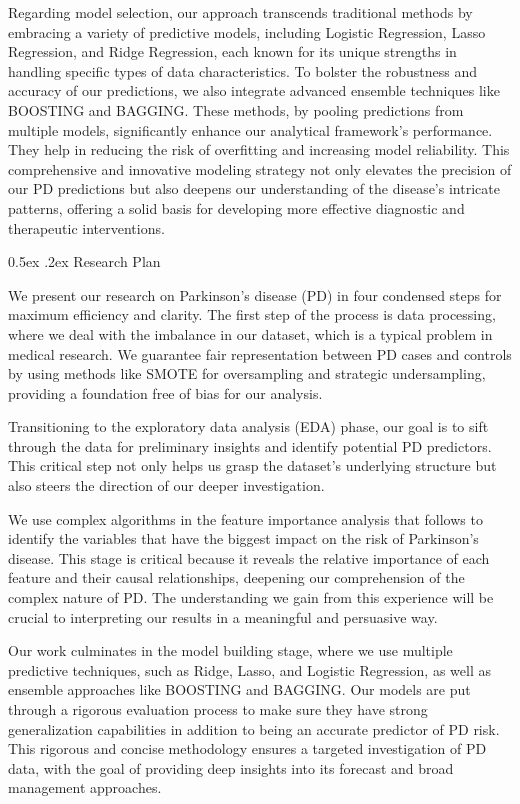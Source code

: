 \documentclass[12pt,]{article}
\makeatletter
\renewcommand\subsection{
  \@startsection{subsection}{2}{\z@}
    {-1.5ex\@plus -1ex \@minus -.2ex}%
    {0.5ex \@plus .2ex}%
    {\normalfont\normalsize\bf}} %
\makeatother
\begin{document}
Regarding model selection, our approach transcends traditional methods
by embracing a variety of predictive models, including Logistic
Regression, Lasso Regression, and Ridge Regression, each known for its
unique strengths in handling specific types of data characteristics. To
bolster the robustness and accuracy of our predictions, we also
integrate advanced ensemble techniques like BOOSTING and BAGGING. These
methods, by pooling predictions from multiple models, significantly
enhance our analytical framework's performance. They help in reducing
the risk of overfitting and increasing model reliability. This
comprehensive and innovative modeling strategy not only elevates the
precision of our PD predictions but also deepens our understanding of
the disease's intricate patterns, offering a solid basis for developing
more effective diagnostic and therapeutic interventions.

\hypertarget{research-plan}{%
\subsection{Research Plan}\label{research-plan}}

We present our research on Parkinson's disease (PD) in four condensed
steps for maximum efficiency and clarity. The first step of the process
is data processing, where we deal with the imbalance in our dataset,
which is a typical problem in medical research. We guarantee fair
representation between PD cases and controls by using methods like SMOTE
for oversampling and strategic undersampling, providing a foundation
free of bias for our analysis.

Transitioning to the exploratory data analysis (EDA) phase, our goal is
to sift through the data for preliminary insights and identify potential
PD predictors. This critical step not only helps us grasp the dataset's
underlying structure but also steers the direction of our deeper
investigation.

We use complex algorithms in the feature importance analysis that
follows to identify the variables that have the biggest impact on the
risk of Parkinson's disease. This stage is critical because it reveals
the relative importance of each feature and their causal relationships,
deepening our comprehension of the complex nature of PD. The
understanding we gain from this experience will be crucial to
interpreting our results in a meaningful and persuasive way.

Our work culminates in the model building stage, where we use multiple
predictive techniques, such as Ridge, Lasso, and Logistic Regression, as
well as ensemble approaches like BOOSTING and BAGGING. Our models are
put through a rigorous evaluation process to make sure they have strong
generalization capabilities in addition to being an accurate predictor
of PD risk. This rigorous and concise methodology ensures a targeted
investigation of PD data, with the goal of providing deep insights into
its forecast and broad management approaches.
\end{document}
